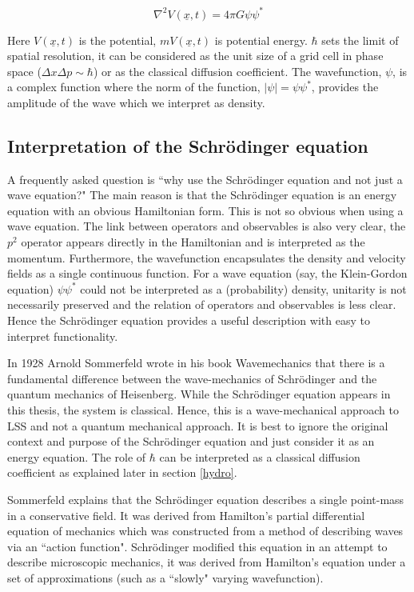 \begin{equation}
\label{eqn_poi}
\nabla^2 V(\underline{x},t) = 4\pi G \psi\psi^*
\end{equation}

\noindent Here $V(\underline{x},t)$ is the potential, $m V(\underline{x},t)$ is potential energy. $\hbar$ sets the limit of spatial resolution, it can be considered  as the unit size of a grid cell in phase space ($\Delta x \Delta p \sim \hbar$) or as the classical diffusion coefficient. The wavefunction, $\psi$, is a complex function where the norm of the function, $|\psi| = \psi \psi^*$, provides the amplitude of the wave which we interpret as density.

\subsection{Interpretation of the Schr\"odinger equation}
A frequently asked question is ``why use the Schr\"odinger equation and not just a wave equation?" The main reason is that the Schr\"odinger equation is an energy equation with an obvious Hamiltonian form. This is not so obvious when using a wave equation. The link between operators and observables is also very clear, the $p^2$ operator appears directly in the Hamiltonian and is interpreted as the momentum. Furthermore, the wavefunction encapsulates the density and velocity fields as a single continuous function. For a wave equation (say, the Klein-Gordon equation) $\psi \psi^*$ could not be interpreted as a (probability) density, unitarity is not necessarily preserved and the relation of operators and observables is less clear. Hence the Schr\"odinger equation provides a useful description with easy to interpret functionality.

In 1928 Arnold Sommerfeld wrote in his book Wavemechanics \citep{bib_som} that there is a fundamental difference between the wave-mechanics of Schr\"odinger and the quantum mechanics of Heisenberg. While the Schr\"odinger equation appears in this thesis, the system is classical. Hence, this is a wave-mechanical approach to LSS and not a quantum mechanical approach. It is best to ignore the original context and purpose of the Schr\"odinger equation and just consider it as an energy equation. The role of $\hbar$ can be interpreted as a classical diffusion coefficient as explained later in section \ref{hydro}.

Sommerfeld explains that the Schr\"odinger equation describes a single point-mass in a conservative field. It was derived from Hamilton's partial differential equation of mechanics which was constructed from a method of describing waves via an ``action function". Schr\"odinger modified this equation in an attempt to describe microscopic mechanics, it was derived from Hamilton's equation under a set of approximations (such as a ``slowly" varying wavefunction).

